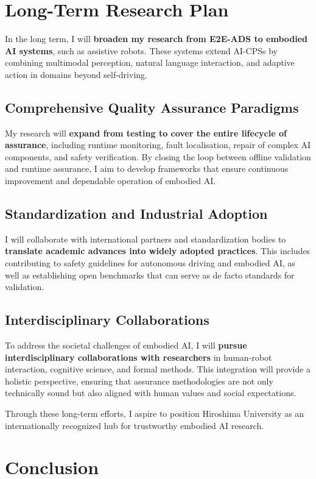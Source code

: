 \documentclass[12pt,a4paper]{article}
\begin{document}
\section{Long-Term Research Plan}

In the long term, I will \textbf{broaden my research from E2E-ADS to embodied AI systems}, such as assistive robots. These systems extend AI-CPSs by combining multimodal perception, natural language interaction, and adaptive action in domains beyond self-driving.

\subsection{Comprehensive Quality Assurance Paradigms}
My research will \textbf{expand from testing to cover the entire lifecycle of assurance}, including runtime monitoring, fault localisation, repair of complex AI components, and safety verification. By closing the loop between offline validation and runtime assurance, I aim to develop frameworks that ensure continuous improvement and dependable operation of embodied AI.

\subsection{Standardization and Industrial Adoption}
I will collaborate with international partners and standardization bodies to \textbf{translate academic advances into widely adopted practices}. This includes contributing to safety guidelines for autonomous driving and embodied AI, as well as establishing open benchmarks that can serve as de facto standards for validation.

\subsection{Interdisciplinary Collaborations}
To address the societal challenges of embodied AI, I will \textbf{pursue interdisciplinary collaborations with researchers} in human-robot interaction, cognitive science, and formal methods. This integration will provide a holistic perspective, ensuring that assurance methodologies are not only technically sound but also aligned with human values and social expectations.

Through these long-term efforts, I aspire to position Hiroshima University as an internationally recognized hub for trustworthy embodied AI research.

\section{Conclusion}
\end{document}
